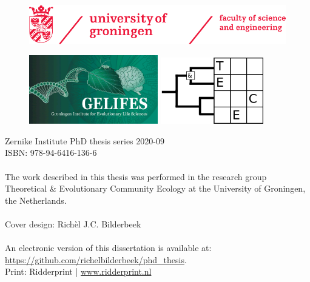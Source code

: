 \begin{titlepage}
%	

	
	
	
	
	\newpage \thispagestyle{empty}
	\vspace*{3.9cm}%
	
	
	\begin{figure}[!h]
		\includegraphics[width=\textwidth]{images/frontmatter/rugr_fse_logoen_rood_cmyk.pdf}
	\end{figure}
	
	\vfill
	\begin{figure}[!h]
		\includegraphics[width=0.5\textwidth]{images/frontmatter/gelifes_header_600x320.png}
		\includegraphics[width=0.4\textwidth]{images/frontmatter/tece_logo_2.png}
	\end{figure}
	\noindent
	{\small 
		Zernike Institute PhD thesis series 2020-09 \\
		ISBN:	978-94-6416-136-6 \\
		\\
		The work described in this thesis was performed in the research group 
    Theoretical \& Evolutionary Community Ecology at the University of Groningen, the Netherlands. \\
		\\
		Cover design: Rich\`el J.C. Bilderbeek \\
		\\
		An electronic version of this dissertation is available at: \\
	  \url{https://github.com/richelbilderbeek/phd_thesis}. \\
		Print: Ridderprint | \url{www.ridderprint.nl} \\
		} 	
	
	
	\clearpage
	
	
	
\end{titlepage}
